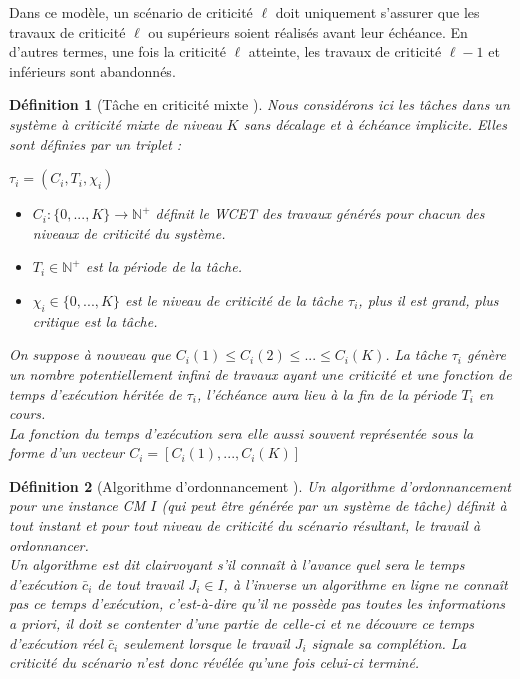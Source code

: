\documentclass[11pt,a4paper,oneside]{book}
\theoremstyle{break}
\newtheorem{defin}{Définition}
\theoremstyle{breakplain}
\begin{document}
Dans ce modèle, un scénario de criticité $\ell$ doit uniquement s'assurer que les travaux de criticité $\ell$ ou supérieurs soient réalisés avant leur échéance. En d'autres termes, une fois la criticité $\ell$ atteinte, les travaux de criticité $\ell-1$ et inférieurs sont abandonnés.

\begin{defin}[Tâche en criticité mixte \cite{BaruahBDMSS11}]
Nous considérons ici les tâches dans un système à criticité mixte de niveau $K$ sans décalage et à échéance implicite. Elles sont définies par un triplet :
\begin{center}
$\tau_i = (C_i, T_i, \chi_i)$\\
\end{center}
\begin{itemize}
\item $C_i : \{0, ..., K\} \rightarrow \mathbb{N}^{+}$ définit le WCET des travaux générés pour chacun des niveaux de criticité du système.
\item $T_i \in \mathbb{N}^{+}$ est la période de la tâche.
\item $\chi_i \in \{0, ..., K\}$ est le niveau de criticité de la tâche $\tau_i$, plus il est grand, plus critique est la tâche.\\
\end{itemize}

On suppose à nouveau que $C_i(1) \leq C_i(2) \leq ... \leq C_i(K)$. La tâche $\tau_i$ génère un nombre potentiellement infini de travaux ayant une criticité et une fonction de temps d'exécution héritée de $\tau_i$, l'échéance aura lieu à la fin de la période $T_i$ en cours.\\
La fonction du temps d'exécution sera elle aussi souvent représentée sous la forme d'un vecteur $C_i = [C_i(1), ..., C_i(K)]$
\end{defin}

\begin{defin}[Algorithme d'ordonnancement \cite{baruah2010towards}]
Un algorithme d'ordonnancement pour une instance CM $I$ (qui peut être générée par un système de tâche) définit à tout instant et pour tout niveau de criticité du scénario résultant, le travail à ordonnancer.\\

Un algorithme est dit clairvoyant s'il connaît à l'avance quel sera le temps d'exécution $\bar{c}_i$ de tout travail $J_i \in I$, à l'inverse un algorithme en ligne ne connaît pas ce temps d'exécution, c'est-à-dire qu'il ne possède pas toutes les informations \textit{a priori}, il doit se contenter d'une partie de celle-ci et ne découvre ce temps d'exécution réel $\bar{c}_i$ seulement lorsque le travail $J_i$ signale sa complétion. La criticité du scénario n'est donc révélée qu'une fois celui-ci terminé.
\end{defin}
\end{document}
